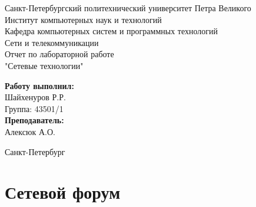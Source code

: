 \documentclass[a4paper,12pt]{extarticle}
\begin{document}
	\begin{center}		%

		\large Санкт-Петербургский политехнический университет Петра Великого\\
		\large Институт компьютерных наук и технологий \\
		\large Кафедра компьютерных систем и программных технологий\\[5cm]
		
		\huge Сети и телекоммуникации\\[0.5cm] %
		\large Отчет по лабораторной работе\\[0.1cm]
		\large "Сетевые технологии"\\[4cm]

	\end{center}
	\begin{flushright} %
		\begin{minipage}{0.35\textwidth} %
			\begin{flushleft} %

				\large\textbf{Работу выполнил:}\\
				\large Шайхенуров Р.Р.\\
				\large {Группа:} 43501/1\\
				
				\large \textbf{Преподаватель:}\\
				\large Алексюк А.О.\\

			\end{flushleft}
		\end{minipage}
	\end{flushright}
	
	\vfill %

	\begin{center}
	\large Санкт-Петербург\\
	\large \the\year %
	\end{center} %

\thispagestyle{empty} %
\newpage
\section{Сетевой форум}
\end{document}
